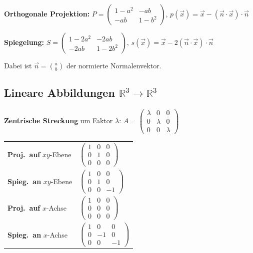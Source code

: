 \textbf{Orthogonale Projektion:}
$P = \begin{pmatrix} 1-a^2 & -ab \\ -ab & 1-b^2 \end{pmatrix}$, \quad $p(\vec{x}) = \vec{x} - (\vec{n} \cdot \vec{x}) \cdot \vec{n}$

\textbf{Spiegelung:}
$S = \begin{pmatrix} 1-2a^2 & -2ab \\ -2ab & 1-2b^2 \end{pmatrix}$, \quad $s(\vec{x}) = \vec{x} - 2(\vec{n} \cdot \vec{x}) \cdot \vec{n}$

Dabei ist $\vec{n} = \binom{a}{b}$ der normierte Normalenvektor.

\subsection{Lineare Abbildungen $\mathbb{R}^3 \to \mathbb{R}^3$}

\textbf{Zentrische Streckung} um Faktor $\lambda$: $A = \begin{pmatrix} \lambda & 0 & 0 \\ 0 & \lambda & 0 \\ 0 & 0 & \lambda \end{pmatrix}$

\begin{tabular}{@{}ll@{}}
\textbf{Proj.\ auf} $xy$-Ebene & $\begin{pmatrix} 1&0&0\\0&1&0\\0&0&0 \end{pmatrix}$ \\[6pt]
\textbf{Spieg.\ an} $xy$-Ebene & $\begin{pmatrix} 1&0&0\\0&1&0\\0&0&-1 \end{pmatrix}$ \\[6pt]
\textbf{Proj.\ auf} $x$-Achse & $\begin{pmatrix} 1&0&0\\0&0&0\\0&0&0 \end{pmatrix}$ \\[6pt]
\textbf{Spieg.\ an} $x$-Achse & $\begin{pmatrix} 1&0&0\\0&-1&0\\0&0&-1 \end{pmatrix}$
\end{tabular}

